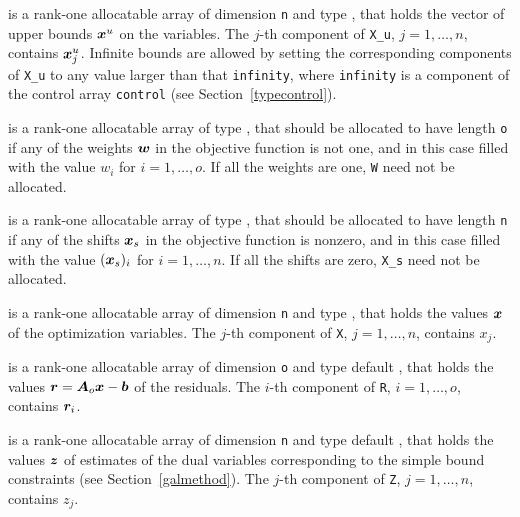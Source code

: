 \documentclass{galahad}
\begin{document}
\begin{description}
 is a rank-one allocatable array of dimension {\tt n} and type
\realdp, that holds
the vector of upper bounds ${\bm{x}}^{u}$ on the variables.
The $j$-th component of {\tt X\_u}, $j = 1, \ldots , n$,
contains ${\bm{x}}_{j}^{u}$.
Infinite bounds are allowed by setting the corresponding
components of {\tt X\_u} to any value larger than that {\tt infinity},
where {\tt infinity} is a component of the control array {\tt control}
(see Section~\ref{typecontrol}).

 is a rank-one allocatable array of type \realdp, that should
be allocated to have length {\tt o} if any of the weights ${\bm{w}}$
in the objective function is not one, and in this case
filled with the value $w_{i}$ for $i = 1, \ldots , o$.
If all the weights are one, {\tt W} need not be allocated.

 is a rank-one allocatable array of type \realdp, that should
be allocated to have length {\tt n} if any of the shifts ${\bm{x}}_s$
in the objective function is nonzero, and in this case
filled with the value $({\bm{x}}_s)_{i}$ for $i = 1, \ldots , n$.
If all the shifts are zero, {\tt X\_s} need not be allocated.

 is a rank-one allocatable array of dimension {\tt n} and type
\realdp,
that holds the values ${\bm{x}}$ of the optimization variables.
The $j$-th component of {\tt X}, $j = 1,  \ldots , n$, contains $x_{j}$.

 is a rank-one allocatable array of dimension {\tt o} and type default
\realdp, that holds the values ${\bm{r}} = {\bm{A}}_o {\bm{x}} - {\bm{b}}$ of the residuals.
The $i$-th component of {\tt R}, $i = 1,  \ldots , o$, contains ${\bm{r}}_{i}$.

 is a rank-one allocatable array of dimension {\tt n} and type default
\realdp, that holds
the values ${\bm{z}}$ of estimates  of the dual variables
corresponding to the simple bound constraints (see Section~\ref{galmethod}).
The $j$-th component of {\tt Z}, $j = 1,  \ldots ,  n$, contains $z_{j}$.


\end{description}
\end{document}

